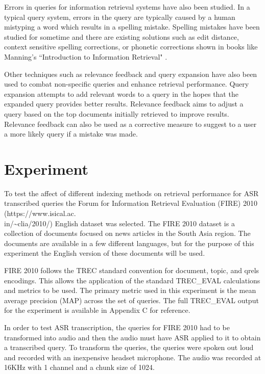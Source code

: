\documentclass[jair, twoside,11pt,theapa]{article}
\begin{document}
Errors in queries for information retrieval systems have also been studied. In a typical query system, errors in the query are typically caused by a human mistyping a word which results in a spelling mistake. Spelling mistakes have been studied for sometime and there are existing solutions such as edit distance, context sensitive spelling corrections, or phonetic corrections shown in books like Manning's ``Introduction to Information Retrieval" \cite{IntroductionIR}. 

Other techniques such as relevance feedback and query expansion have also been used to combat non-specific queries and enhance retrieval performance. Query expansion attempts to add relevant words to a query in the hopes that the expanded query provides better results. Relevance feedback aims to adjust a query based on the top documents initially retrieved to improve results. Relevance feedback can also be used as a corrective measure to suggest to a user a more likely query if a mistake was made. 


\section{Experiment}
\label{Experiment}
To test the affect of different indexing methods on retrieval performance for ASR transcribed queries the Forum for Information Retrieval Evaluation (FIRE) 2010 (https://www.isical.ac.\\in/\textasciitilde{}clia/2010/) English dataset was selected. The FIRE 2010 dataset is a collection of documents focused on news articles in the South Asia region. The documents are available in a few different languages, but for the purpose of this experiment the English version of these documents will be used. 

FIRE 2010 follows the TREC standard convention for document, topic, and qrels encodings. This allows the application of the standard TREC\_EVAL calculations and metrics to be used. The primary metric used in this experiment is the mean average precision (MAP) across the set of queries. The full TREC\_EVAL output for the experiment is available in Appendix C for reference. 

In order to test ASR transcription, the queries for FIRE 2010 had to be transformed into audio and then the audio must have ASR applied to it to obtain a transcribed query. To transform the queries, the queries were spoken out loud and recorded with an inexpensive headset microphone. The audio was recorded at 16KHz with 1 channel and a chunk size of 1024. 
\end{document}
